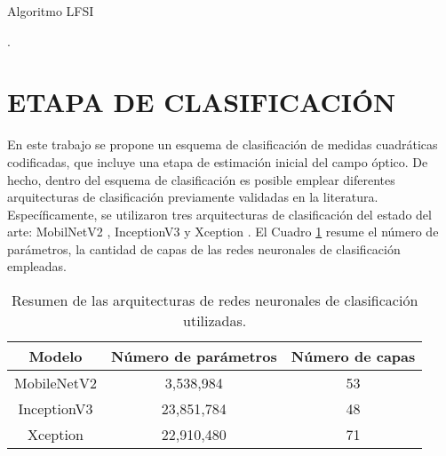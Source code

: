 \begin{algoritmo}[!h]
    \caption{Algoritmo LFSI }\label{fsi_algo}
    \begin{algorithmic}[1]
		.		
		\EndFor
	\end{algorithmic}
    \label{alg_1}
\end{algoritmo}


\section{ETAPA DE CLASIFICACIÓN}

En este trabajo se propone un esquema de clasificación de medidas cuadráticas codificadas, que incluye una etapa de estimación inicial del campo óptico. De hecho, dentro del esquema de clasificación es posible emplear diferentes arquitecturas de clasificación previamente validadas en la literatura. Específicamente, se utilizaron tres arquitecturas de clasificación del estado del arte: MobilNetV2 , InceptionV3   y Xception . El Cuadro \ref{tab:comp_class_models} resume el número de parámetros, la cantidad de capas de las redes neuronales de clasificación empleadas.

\begin{table}[!h]
\centering
\caption{Resumen de las arquitecturas de redes neuronales de clasificación utilizadas.}
\begin{tabular}{|c|c|c|}
\hline
\textbf{Modelo}      & \textbf{Número de parámetros} & \textbf{Número de capas} \\ \hline
MobileNetV2 & 3,538,984            & 53              \\ \hline
InceptionV3 & 23,851,784           & 48              \\ \hline
Xception    & 22,910,480           & 71              \\ \hline
\end{tabular}
\label{tab:comp_class_models}
\end{table}

